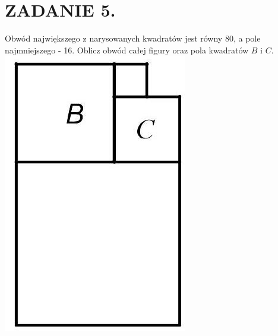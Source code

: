 \documentclass[10pt]{article}
\begin{document}
\section*{ZADANIE 5.}
Obwód największego z narysowanych kwadratów jest równy 80, a pole najmniejszego - 16. Oblicz obwód całej figury oraz pola kwadratów \(B\) i \(C\).\\
\includegraphics[max width=\textwidth, center]{2024_11_21_060a5cad90845cd37d9ag-1}
\end{document}
